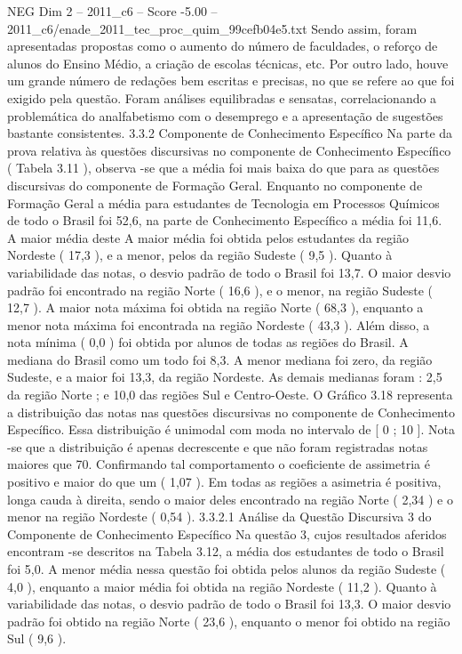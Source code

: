 \begin{textsample}{NEG Dim 2 – 2011\_c6 – Score -5.00 – 2011\_c6/enade\_2011\_tec\_proc\_quim\_99cefb04e5.txt}
Sendo assim, foram apresentadas propostas como o aumento do número de faculdades, o reforço de alunos do Ensino Médio, a criação de escolas técnicas, etc.
Por outro lado, houve um grande número de redações bem escritas e precisas, no que se refere ao que foi exigido pela questão.
Foram análises equilibradas e sensatas, correlacionando a problemática do analfabetismo com o desemprego e a apresentação de sugestões bastante consistentes. 3.3.2 Componente de Conhecimento Específico Na parte da prova relativa às questões discursivas no componente de Conhecimento Específico ( Tabela 3.11 ), observa -se que a média foi mais baixa do que para as questões discursivas do componente de Formação Geral.
Enquanto no componente de Formação Geral a média para estudantes de Tecnologia em Processos Químicos de todo o Brasil foi 52,6, na parte de Conhecimento Específico a média foi 11,6.
A maior média deste A maior média foi obtida pelos estudantes da região Nordeste ( 17,3 ), e a menor, pelos da região Sudeste ( 9,5 ).
Quanto à variabilidade das notas, o desvio padrão de todo o Brasil foi 13,7.
O maior desvio padrão foi encontrado na região Norte ( 16,6 ), e o menor, na região Sudeste ( 12,7 ).
A maior nota máxima foi obtida na região Norte ( 68,3 ), enquanto a menor nota máxima foi encontrada na região Nordeste ( 43,3 ).
Além disso, a nota mínima ( 0,0 ) foi obtida por alunos de todas as regiões do Brasil.
A mediana do Brasil como um todo foi 8,3.
A menor mediana foi zero, da região Sudeste, e a maior foi 13,3, da região Nordeste.
As demais medianas foram : 2,5 da região Norte ; e 10,0 das regiões Sul e Centro-Oeste.
O Gráfico 3.18 representa a distribuição das notas nas questões discursivas no componente de Conhecimento Específico.
Essa distribuição é unimodal com moda no intervalo de [ 0 ; 10 ].
Nota -se que a distribuição é apenas decrescente e que não foram registradas notas maiores que 70.
Confirmando tal comportamento o coeficiente de assimetria é positivo e maior do que um ( 1,07 ).
Em todas as regiões a asimetria é positiva, longa cauda à direita, sendo o maior deles encontrado na região Norte ( 2,34 ) e o menor na região Nordeste ( 0,54 ). 3.3.2.1 Análise da Questão Discursiva 3 do Componente de Conhecimento Específico Na questão 3, cujos resultados aferidos encontram -se descritos na Tabela 3.12, a média dos estudantes de todo o Brasil foi 5,0.
A menor média nessa questão foi obtida pelos alunos da região Sudeste ( 4,0 ), enquanto a maior média foi obtida na região Nordeste ( 11,2 ).
Quanto à variabilidade das notas, o desvio padrão de todo o Brasil foi 13,3.
O maior desvio padrão foi obtido na região Norte ( 23,6 ), enquanto o menor foi obtido na região Sul ( 9,6 ).

\end{textsample}
